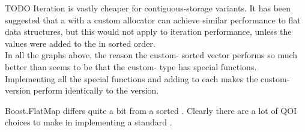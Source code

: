 TODO Iteration is vastly cheaper for contiguous-storage variants.  It has been
suggested that a  with a custom allocator can achieve similar
performance to flat data structures, but this would not apply to iteration
performance, unless the values were added to the  in sorted order.\\

In all the graphs above, the reason the custom- sorted vector
performs so much better than  seems to be that
the custom- type has  special functions.
Implementing all the special functions and adding  to
each makes the custom- version perform identically to the
 version.

Boost.FlatMap differs quite a bit from a sorted .  Clearly there
are a lot of QOI choices to make in implementing a standard .
